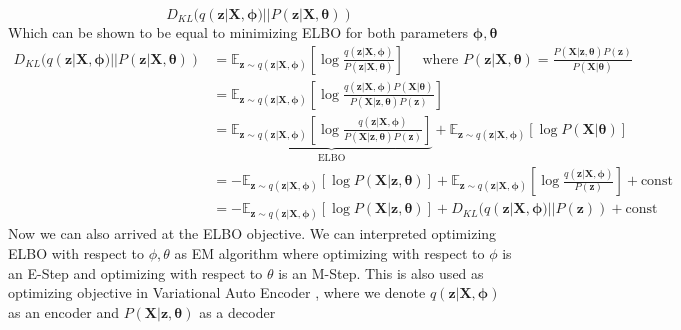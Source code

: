 \begin{equation}
    D_{KL}(q(\boldsymbol{z}| \boldsymbol{X}, \boldsymbol{\phi}) || P( \boldsymbol{z} |\boldsymbol{X} , \boldsymbol{\theta}) )
\end{equation}
Which can be shown to be equal to minimizing ELBO for both parameters $\boldsymbol{\phi}, \boldsymbol{\theta}$
\begin{equation}
    \begin{aligned}
        D_{KL}(q(\boldsymbol{z}| \boldsymbol{X}, \boldsymbol{\phi}) || P( \boldsymbol{z} |\boldsymbol{X} , \boldsymbol{\theta}) ) &= \mathbb{E}_{\boldsymbol{z} \sim q(\boldsymbol{z} | \boldsymbol{X}, \boldsymbol{\phi})} \left[ \log \frac{q(\boldsymbol{z} | \boldsymbol{X}, \boldsymbol{\phi})}{P(\boldsymbol{z} | \boldsymbol{X}, \boldsymbol{\theta})} \right] \quad \text{ where } P(\boldsymbol{z} | \boldsymbol{X}, \boldsymbol{\theta}) = \frac{P(\boldsymbol{X} | \boldsymbol{z}, \boldsymbol{\theta}) P(\boldsymbol{z})}{P(\boldsymbol{X} | \boldsymbol{\theta})} \\ 
        &= \mathbb{E}_{\boldsymbol{z} \sim q(\boldsymbol{z} | \boldsymbol{X}, \boldsymbol{\phi})} \left[ \log \frac{q(\boldsymbol{z} | \boldsymbol{X}, \boldsymbol{\phi}) P(\boldsymbol{X} | \boldsymbol{\theta})}{P(\boldsymbol{X} | \boldsymbol{z}, \boldsymbol{\theta}) P(\boldsymbol{z})} \right] \\ 
        &= \underbrace{\mathbb{E}_{\boldsymbol{z} \sim q(\boldsymbol{z} | \boldsymbol{X}, \boldsymbol{\phi})} \left[ \log \frac{q(\boldsymbol{z} | \boldsymbol{X}, \boldsymbol{\phi})}{P(\boldsymbol{X} | \boldsymbol{z}, \boldsymbol{\theta}) P(\boldsymbol{z})} \right]}_{\text{ELBO}} + \mathbb{E}_{\boldsymbol{z} \sim q(\boldsymbol{z} | \boldsymbol{X}, \boldsymbol{\phi})} \left[ \log P(\boldsymbol{X} | \boldsymbol{\theta}) \right]  \\ 
        &= -\mathbb{E}_{\boldsymbol{z} \sim q(\boldsymbol{z} | \boldsymbol{X}, \boldsymbol{\phi})} \left[ \log P(\boldsymbol{X} | \boldsymbol{z}, \boldsymbol{\theta}) \right] + \mathbb{E}_{\boldsymbol{z} \sim q(\boldsymbol{z} | \boldsymbol{X}, \boldsymbol{\phi})} \left[ \log \frac{q(\boldsymbol{z} | \boldsymbol{X}, \boldsymbol{\phi})}{P(\boldsymbol{z})} \right] + \text{const} \\ 
        &= -\mathbb{E}_{\boldsymbol{z} \sim q(\boldsymbol{z} | \boldsymbol{X}, \boldsymbol{\phi})} \left[ \log P(\boldsymbol{X} | \boldsymbol{z}, \boldsymbol{\theta}) \right] + D_{KL}(q(\boldsymbol{z} | \boldsymbol{X}, \boldsymbol{\phi}) || P(\boldsymbol{z})) + \text{const}
    \end{aligned}
\end{equation}
Now we can also arrived at the ELBO objective. We can interpreted optimizing ELBO with respect to $\phi, \theta$ as EM algorithm where optimizing with respect to $\phi$ is an E-Step and optimizing with respect to $\theta$ is an M-Step. This is also used as optimizing objective in Variational Auto Encoder \cite{kingma2013auto}, where we denote $q(\boldsymbol{z} | \boldsymbol{X}, \boldsymbol{\phi})$ as an encoder and $P(\boldsymbol{X} | \boldsymbol{z}, \boldsymbol{\theta})$ as a decoder



